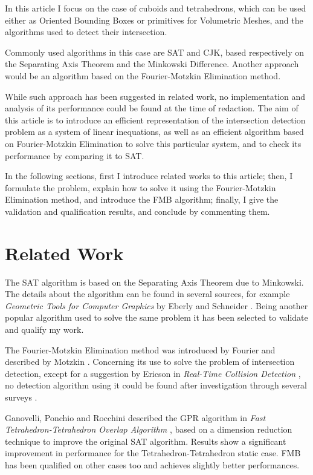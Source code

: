 \documentclass[12pt, a4paper]{article}
\begin{document}
In this article I focus on the case of cuboids and tetrahedrons, which can be used either as Oriented Bounding Boxes or primitives for Volumetric Meshes, and the algorithms used to detect their intersection.

Commonly used algorithms in this case are SAT and CJK, based respectively on the Separating Axis Theorem and the Minkowski Difference. Another approach would be an algorithm based on the Fourier-Motzkin Elimination method. 

While such approach has been suggested in related work, no implementation and analysis of its performance could be found at the time of redaction. The aim of this article is to introduce an efficient representation of the intersection detection problem as a system of linear inequations, as well as an efficient algorithm based on Fourier-Motzkin Elimination to solve this particular system, and to check its performance by comparing it to SAT.

In the following sections, first I introduce related works to this article; then, I formulate the problem, explain how to solve it using the Fourier-Motzkin Elimination method, and introduce the FMB algorithm; finally, I give the validation and qualification results, and conclude by commenting them.

\section{Related Work}
\label{sec:relatedwork}

The SAT algorithm is based on the Separating Axis Theorem due to Minkowski. The details about the algorithm can be found in several sources, for example \emph{Geometric Tools for Computer Graphics} by Eberly and Schneider \cite{Eberly:2003}. Being another popular algorithm used to solve the same problem it has been selected to validate and qualify my work.

The Fourier-Motzkin Elimination method was introduced by Fourier \cite{Fourier:1827} and described by Motzkin \cite{Motzkin:1936}. Concerning its use to solve the problem of intersection detection, except for a suggestion by Ericson in \emph{Real-Time Collision Detection} \cite{Ericson:2005}, no detection algorithm using it could be found after investigation through several surveys \cite{Hornus:2015}\cite{Kunzler:2004}\cite{Jimenez:2001}\cite{Lin:1998}.

Ganovelli, Ponchio and Rocchini described the GPR algorithm in \emph{Fast Tetrahedron-Tetrahedron Overlap Algorithm} \cite{Ganovelli:2002}, based on a dimension reduction technique to improve the original SAT algorithm. Results show a significant improvement in performance for the Tetrahedron-Tetrahedron static case. FMB has been qualified on other cases too and achieves slightly better performances.
\end{document}
